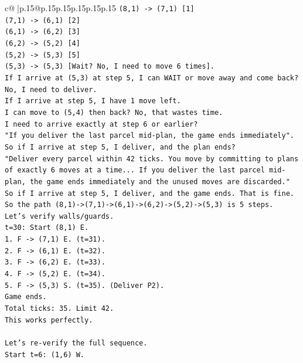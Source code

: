 \documentclass{article}
\begin{document}
{\begin{supertabular}{c@{$\;$}|p{.15\linewidth}@{}p{.15\linewidth}p{.15\linewidth}p{.15\linewidth}p{.15\linewidth}p{.15\linewidth}}
{{{\texttt{(8,1) {-}> (7,1) {[}1{]}} \\
\texttt{(7,1) {-}> (6,1) {[}2{]}} \\
\texttt{(6,1) {-}> (6,2) {[}3{]}} \\
\texttt{(6,2) {-}> (5,2) {[}4{]}} \\
\texttt{(5,2) {-}> (5,3) {[}5{]}} \\
\texttt{(5,3) {-}> (5,3) {[}Wait? No, I need to move 6 times{]}.} \\
\texttt{If I arrive at (5,3) at step 5, I can WAIT or move away and come back? No, I need to deliver.} \\
\texttt{If I arrive at step 5, I have 1 move left.} \\
\texttt{I can move to (5,4) then back? No, that wastes time.} \\
\texttt{I need to arrive exactly at step 6 or earlier?} \\
\texttt{"If you deliver the last parcel mid{-}plan, the game ends immediately".} \\
\texttt{So if I arrive at step 5, I deliver, and the plan ends?} \\
\texttt{"Deliver every parcel within 42 ticks. You move by committing to plans of exactly 6 moves at a time... If you deliver the last parcel mid{-}plan, the game ends immediately and the unused moves are discarded."} \\
\texttt{So if I arrive at step 5, I deliver, and the game ends. That is fine.} \\
\texttt{So the path (8,1){-}>(7,1){-}>(6,1){-}>(6,2){-}>(5,2){-}>(5,3) is 5 steps.} \\
\texttt{Let's verify walls/guards.} \\
\texttt{t=30: Start (8,1) E.} \\
\texttt{1. F {-}> (7,1) E. (t=31).} \\
\texttt{2. F {-}> (6,1) E. (t=32).} \\
\texttt{3. F {-}> (6,2) E. (t=33).} \\
\texttt{4. F {-}> (5,2) E. (t=34).} \\
\texttt{5. F {-}> (5,3) S. (t=35). (Deliver P2).} \\
\texttt{Game ends.} \\
\texttt{Total ticks: 35. Limit 42.} \\
\texttt{This works perfectly.} \\
\\ 
\texttt{Let's re{-}verify the full sequence.} \\
\texttt{Start t=6: (1,6) W.} \\
}}}
\end{supertabular}}
\end{document}
